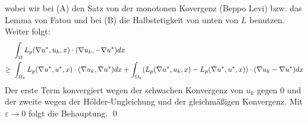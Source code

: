 \begin{enumerate}[1.]
\begin{equation}
		\end{equation}
		wobei wir bei (A) den Satz von der monotonen Kovergenz (Beppo Levi) bzw. das Lemma von Fatou und bei (B) die Halbstetigkeit von unten von $L$ benutzen. Weiter folgt:
		\begin{equation}
		\begin{aligned}
			&\int_\Omega L_p(\nabla u^*,u_k,x) \cdot (\nabla u_k,-\nabla u^*) dx \\ \notag
			\geq \ &\int_{\Omega_\varepsilon} L_p(\nabla u^*,u^*,x) \cdot (\nabla u_k,\nabla u^*) dx + \int_{\Omega_\varepsilon} (L_p(\nabla u^*,u_k,x) - L_p(\nabla u^*,u^*,x)) \cdot (\nabla u_k - \nabla u^*) dx
		\end{aligned}
		\end{equation}
		Der erste Term konvergiert wegen der schwachen Konvergenz von $u_k$ gegen 0 und der zweite wegen der Hölder-Ungleichung und der gleichmäßigen Konvergenz. Mit $\varepsilon \rightarrow 0$ folgt die Behauptung. \qed
	\end{enumerate}
\newpage